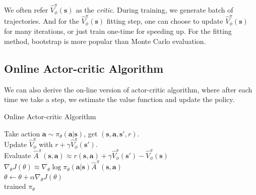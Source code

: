 \documentclass{tufte-handout}
\newcommand{\s}{\mathbf{s}}
\newcommand{\act}{\mathbf{a}}
\begin{document}
We often refer $\hat{V}_\phi ^ \pi (\s)$ as the \emph{critic}. During training, we generate batch of trajectories. And for the $\hat{V}_\phi ^ \pi (\s)$ fitting step, one can choose to update $\hat{V}_\phi ^ \pi (\s)$ for many iterations, or just train one-time for speeding up. For the fitting method, bootstrap is more popular than Monte Carlo evaluation.

\subsection{Online Actor-critic Algorithm}

We can also derive the on-line version of actor-critic algorithm, where after each time we take a step, we estimate the value function and update the policy.

\begin{algorithm}
  \caption{Online Actor-critic Algorithm}
    \label{algo:online-ac}
    \begin{algorithmic}[1]
    \STATE Take action $\act \sim \pi_\theta(\act| \s)$, get $(\s, \act, \s', r)$. \\
    \STATE Update $\hat{V}_\phi ^ \pi$ with $r + \gamma \hat{V}_\phi ^ \pi (\s') $. \\
    \STATE Evaluate $\hat{A}^\pi(\s, \act) \approx r(\s, \act) + \gamma \hat{V}^\pi_\phi (\s') - \hat{V}^\pi_\phi(\s)$ \\
    \STATE $\nabla _\theta J(\theta) \approx \nabla_\theta \log \pi_\theta(\act| \s) \hat{A}^\pi(\s, \act)$ \\
    \STATE $ \theta \leftarrow \theta + \alpha \nabla _\theta J(\theta)$ \\
    \ENDWHILE
    \RETURN trained $\pi_\theta$  %
  \end{algorithmic}
\end{algorithm}
\end{document}
